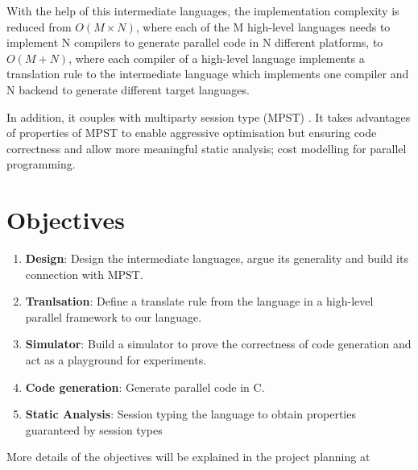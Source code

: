 With the help of this intermediate languages, the implementation complexity is reduced from $O(M \times N)$, where each of the M high-level languages needs to implement N compilers to generate parallel code in N different platforms, to $O(M + N)$, where each compiler of a high-level language implements a translation rule to the intermediate language which implements one compiler and N backend to generate different target languages.

In addition, it couples with multiparty session type (MPST) \cite{coppoGentleIntroductionMultiparty2015}. It takes advantages of properties of MPST to enable aggressive optimisation but ensuring code correctness and allow more meaningful static analysis; \eg cost modelling for parallel programming. %

\section{Objectives}
\begin{enumerate}
\item \textbf{Design}: Design the intermediate languages, argue its generality and build its connection with MPST. 
\item \textbf{Tranlsation}: Define a translate rule from the language in a high-level parallel framework to our language. 
\item \textbf{Simulator}: Build a simulator to prove the correctness of code generation and act as a playground for experiments.
\item \textbf{Code generation}: Generate parallel code in C.
\item \textbf{Static Analysis}: Session typing the language to obtain properties guaranteed by session types%
\end{enumerate}
More details of the objectives will be explained in the project planning at 
